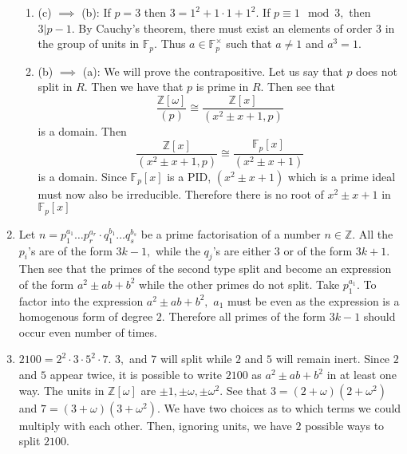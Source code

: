 \documentclass[]{article}
\begin{document}
\begin{enumerate}
\begin{enumerate}
		\item (c) $\implies$ (b): If $p=3$ then $3=1^2+1\cdot 1+1^2.$ If $ p \equiv 1 \mod 3,$ then $3|p-1.$ By Cauchy's theorem, there must exist an elements of order $3$ in the group of units in $\mathbb{F}_p.$ Thus $a \in \mathbb{F}_p^{\times}$ such that $a\neq 1$ and $a^3=1$.
		
		\item (b) $\implies$ (a): We will prove the contrapositive. Let us say that $p$ does not split in $R$. Then we have that $p$ is prime in $R$. Then see that $$\frac{\mathbb{Z}[\omega]}{(p)} \cong \frac{\mathbb{Z}[x]}{(x^2\pm x +1,p)} $$ is a domain. Then $$\frac{\mathbb{Z}[x]}{(x^2\pm x +1,p)} \cong \frac{\mathbb{F}_p[x]}{(x^2\pm x +1)} $$ is a domain. Since $\mathbb{F}_p[x]$ is a PID, $(x^2 \pm x +1)$ which is a prime ideal must now also be irreducible. Therefore there is no root of $x^2 \pm x +1$ in $\mathbb{F}_p[x]$
  	\end{enumerate}
 \item Let $ n= p_1^{a_1}\dots p_{r}^{a_r}\cdot q_1^{b_1}\dots q_s^{b_s}$ be a prime factorisation of a number $n \in \mathbb{Z}.$ All the $p_i$'s are of the form $3k-1,$ while the $q_j$'s are either $3$ or of the form $3k+1.$ Then see that the primes of the second type split and become an expression of the form $a^2 \pm ab +b^2$ while the other primes do not split. Take $p_1^{a_1}.$ To factor into the expression $a^2 \pm ab +b^2,$ $a_1$ must be even as the expression is a homogenous form of degree $2.$ Therefore all primes of the form $3k-1$ should occur even number of times.  
 \item $2100=2^2 \cdot 3 \cdot 5^2 \cdot 7.$ $3,$ and $ 7$ will split while $2$ and $5$ will remain inert. Since $2$ and $5$ appear twice, it is possible to write $2100$ as $a^2\pm ab +b^2$ in at least one way. The units in $\mathbb{Z}[\omega]$ are $\pm1,\pm \omega, \pm \omega^2.$ See that $3=(2+\omega)(2+\omega^2)$ and $7=(3+\omega)(3+\omega^2).$ We have two choices as to which terms we could multiply with each other. Then, ignoring units, we have $2$ possible ways to split $2100.$
\end{enumerate}
\end{document}
